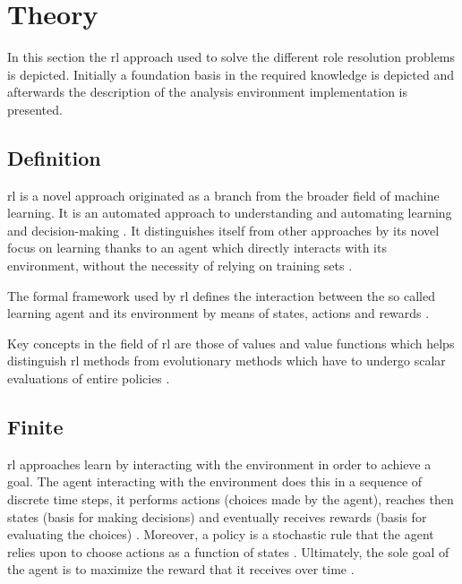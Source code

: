 \documentclass{seal_thesis}
\begin{document}
\section{ Theory}
\label{sec:rl_theory}

In this section the \gls{rl} approach used to solve the different role resolution problems is depicted. Initially a foundation basis in the required knowledge is depicted and afterwards the description of the analysis environment implementation is presented.

\subsection{ Definition}

\gls{rl} is a novel approach originated as a branch from the broader field of machine learning. It is an automated approach to understanding and automating learning and decision-making \cite[p. 15]{Sutton2017}. It distinguishes itself from other approaches by its novel focus on learning thanks to an agent which directly interacts with its environment, without the necessity of relying on training sets \cite[p. 15]{Sutton2017}.

The formal framework used by \gls{rl} defines the interaction between the so called learning agent and its environment by means of states, actions and rewards \cite[p. 15]{Sutton2017}.

Key concepts in the field of \gls{rl} are those of values and value functions which helps distinguish \gls{rl} methods from evolutionary methods which have to undergo scalar evaluations of entire policies \cite[p. 15]{Sutton2017}.

\subsection{Finite }

\gls{rl} approaches learn by interacting with the environment in order to achieve a goal. The agent interacting with the environment does this in a sequence of discrete time steps, it performs actions (choices made by the agent), reaches then states (basis for making decisions) and eventually receives rewards (basis for evaluating the choices) \cite[p. 73]{Sutton2017}. Moreover, a policy is a stochastic rule that the agent relies upon to choose actions as a function of states \cite[p. 73]{Sutton2017}. Ultimately, the sole goal of the agent is to maximize the reward that it receives over time \cite[p. 73]{Sutton2017}.
\end{document}
